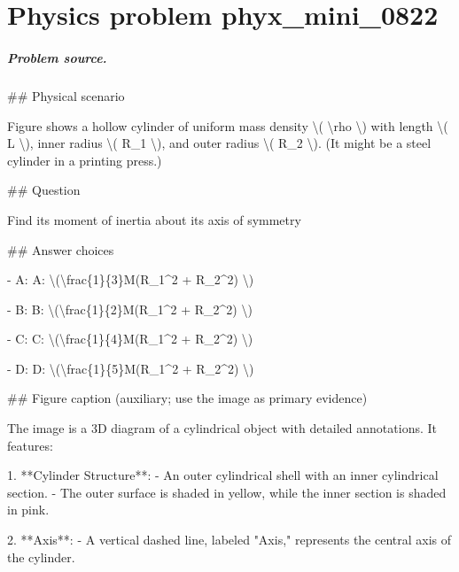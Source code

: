 
\chapter{Physics problem phyx\_mini\_0822}
\label{ch:PhyXMiniProblems_problem_phyx_mini_0822}

\paragraph{Problem source.}
\#\# Physical scenario

Figure shows a hollow cylinder of uniform mass density \textbackslash{}( \textbackslash{}rho \textbackslash{}) with length \textbackslash{}( L \textbackslash{}), inner radius \textbackslash{}( R\_1 \textbackslash{}), and outer radius \textbackslash{}( R\_2 \textbackslash{}). (It might be a steel cylinder in a printing press.)

\#\# Question

Find its moment of inertia about its axis of symmetry

\#\# Answer choices

- A: A: \textbackslash{}(\textbackslash{}frac\{1\}\{3\}M(R\_1\textasciicircum{}2 + R\_2\textasciicircum{}2) \textbackslash{})

- B: B: \textbackslash{}(\textbackslash{}frac\{1\}\{2\}M(R\_1\textasciicircum{}2 + R\_2\textasciicircum{}2) \textbackslash{})

- C: C: \textbackslash{}(\textbackslash{}frac\{1\}\{4\}M(R\_1\textasciicircum{}2 + R\_2\textasciicircum{}2) \textbackslash{})

- D: D: \textbackslash{}(\textbackslash{}frac\{1\}\{5\}M(R\_1\textasciicircum{}2 + R\_2\textasciicircum{}2) \textbackslash{})

\#\# Figure caption (auxiliary; use the image as primary evidence)

The image is a 3D diagram of a cylindrical object with detailed annotations. It features:

1. **Cylinder Structure**:
   - An outer cylindrical shell with an inner cylindrical section.
   - The outer surface is shaded in yellow, while the inner section is shaded in pink.

2. **Axis**: 
   - A vertical dashed line, labeled "Axis," represents the central axis of the cylinder.

